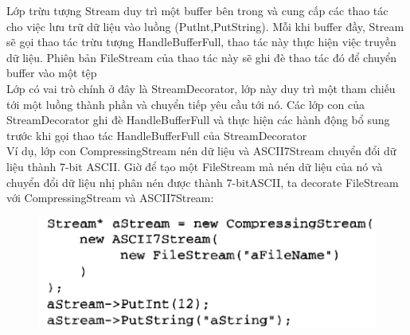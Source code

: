 \begin{itemize}
    Lớp trừu tượng Stream duy trì một buffer bên trong và cung cấp các thao tác cho việc lưu trữ dữ liệu vào luồng (Putlnt,PutString). Mỗi khi buffer đầy, Stream sẽ gọi thao tác trừu tượng HandleBufferFull, thao tác này thực hiện việc truyền dữ liệu. Phiên bản FileStream của thao tác này sẽ ghi đè thao tác đó để chuyển buffer vào một tệp\\[0.1in]
    Lớp có vai trò chính ở đây là StreamDecorator, lớp này duy trì một tham chiếu tới một luồng thành phần và chuyển tiếp yêu cầu tới nó. Các lớp con của StreamDecorator ghi đè HandleBufferFull và thực hiện các hành động bổ sung trước khi gọi thao tác HandleBufferFull của StreamDecorator\\
    Ví dụ, lớp con CompressingStream nén dữ liệu và ASCII7Stream chuyển đổi dữ liệu thành 7-bit ASCII. Giờ để tạo một FileStream mà nén dữ liệu của nó và chuyển đổi dữ liệu nhị phân nén được thành 7-bitASCII, ta decorate FileStream với CompressingStream và ASCII7Stream:
    \begin{figure}[!htb]
        \centering
        \includegraphics[width=\textwidth]{fig/Decorator/hmm2.png}
    \end{figure}
\end{itemize}

